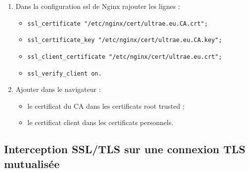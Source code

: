 \begin{enumerate}
    \item Dans la configuration ssl de Nginx rajouter les lignes :
    \begin{itemize}
        \item \texttt{ssl\_certificate "/etc/nginx/cert/ultrae.eu.CA.crt";}
        \item \texttt{ssl\_certificate\_key "/etc/nginx/cert/ultrae.eu.CA.key";}
        \item \texttt{ssl\_client\_certificate "/etc/nginx/cert/ultrae.eu.crt";}
        \item \texttt{ssl\_verify\_client on.}
    \end{itemize}
    
    \item Ajouter dans le navigateur :
    \begin{itemize}
        \item le certificat du CA dans les certificats root trusted ;
        \item le certificat client dans les certificats personnels.
    \end{itemize}
\end{enumerate}

\subsection{Interception SSL/TLS sur une connexion TLS mutualisée}


